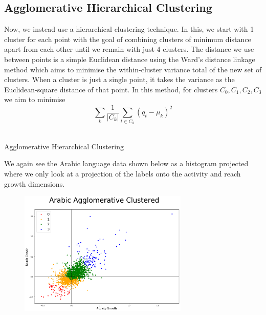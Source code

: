 \documentclass[12pt]{article}
\makeatletter
\def\BState{\State\hskip-\ALG@thistlm}
\makeatother
\begin{document}
\subsection{Agglomerative Hierarchical Clustering}
Now, we instead use a hierarchical clustering technique. In this, we start with 1 cluster for each point with the goal of combining clusters of minimum distance apart from each other until we remain with just 4 clusters. The distance we use between points is a simple Euclidean distance using the Ward's distance linkage method which aims to minimise the within-cluster variance total of the new set of clusters. When a cluster is just a single point, it takes the variance as the Euclidean-square distance of that point. In this method, for clusters $C_0,C_1,C_2,C_3$ we aim to minimise $$\sum_k \frac{1}{\lvert C_k \rvert}\sum_{t \in C_k} (q_t - \mu_k)^2$$\\
\FloatBarrier
\begin{algorithm}
\caption{Agglomerative Hierarchical Clustering}
\end{algorithm}
\FloatBarrier
We again see the Arabic language data shown below as a histogram projected where we only look at a projection of the labels onto the activity and reach growth dimensions.
\FloatBarrier
\begin{figure}[hbtp]\centering
\includegraphics[width=0.72\textwidth,clip]{ArabicWardMethod.png}
\end{figure}
\end{document}
